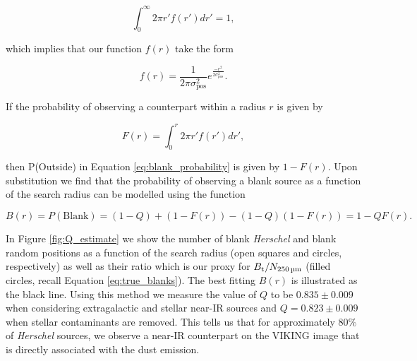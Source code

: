 \begin{equation}
    \int_0^\infty 2\pi r'f(r')dr' = 1,
\end{equation}

\noindent which implies that our function $f(r)$ take the form

\begin{equation}
    f(r) = \frac{1}{2\pi\sigma_\textrm{pos}^2}e^{\frac{-r^2}{2\sigma_\textrm{pos}^2}}.
\label{eq:positional_offset_distribution}
\end{equation}

If the probability of observing a counterpart within a radius $r$ is given by

\begin{equation}
    F(r) = \int_0^r 2\pi r'f(r')dr',
\end{equation}

\noindent then P(Outside) in Equation \ref{eq:blank_probability} is given by $1 - F(r)$. Upon substitution we find that the probability of observing a blank source as a function of the search radius can be modelled using the function

\begin{equation}
    B(r) = P(\textrm{Blank}) = (1-Q) + (1-F(r)) - (1-Q)(1-F(r)) = 1 - QF(r).
\label{eq:blanks_model}
\end{equation}

In Figure \ref{fig:Q_estimate} we show the number of blank \textit{Herschel} and blank random positions as a function of the search radius (open squares and circles, respectively) as well as their ratio which is our proxy for $B_{\textrm{t}}/N_{\textrm{250\,\micron}}$ (filled circles, recall Equation \ref{eq:true_blanks}). The best fitting $B(r)$ is illustrated as the black line. Using this method we measure the value of $Q$ to be $0.835\pm0.009$ when considering extragalactic and stellar near-IR sources and $Q = 0.823\pm0.009$ when stellar contaminants are removed. This tells us that for approximately $80\%$ of \textit{Herschel} sources, we observe a near-IR counterpart on the VIKING image that is directly associated with the dust emission.

